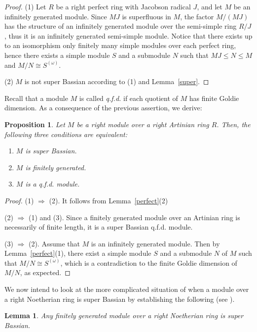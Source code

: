 \documentclass{amsart}
\newtheorem{lm}[thm]{Lemma}
\newtheorem{prop}[thm]{Proposition}
\theoremstyle{definition}
\begin{document}
\begin{proof} (1) Let $R$ be a right perfect ring with Jacobson radical $J$, and let $M$ be an infinitely generated module. Since $MJ$ is superfluous in $M$, the factor $M/(MJ)$ has the structure of an infinitely generated module over the semi-simple ring $R/J$, thus it is an infinitely generated semi-simple module. Notice that there exists up to an isomorphism only finitely many simple modules over each perfect ring, hence there exists a simple module $S$ and a submodule $N$ such that $MJ\le N\le M$ and
$M/N\cong S^{(\omega)}$.

(2) $M$ is not super Bassian according to (1) and Lemma~\ref{super}.
\end{proof}

Recall that a module $M$ is called {\it q.f.d.} if each quotient of $M$ has finite Goldie dimension.
As a consequence of the previous assertion, we derive:

\begin{prop} Let $M$ be a right module over a right Artinian ring $R$. Then, the following three conditions are equivalent:
\begin{enumerate}
\item $M$ is super Bassian.
\item $M$ is finitely generated.
\item $M$ is a q.f.d. module.
\end{enumerate}	
\end{prop}

\begin{proof} (1) $\Rightarrow$ (2). It follows from Lemma~\ref{perfect}(2)

(2) $\Rightarrow$ (1) and (3). Since a finitely generated module over an Artinian ring is necessarily of finite length, it is a super Bassian q.f.d. module.
	
(3) $\Rightarrow$ (2). Assume that $M$ is an infinitely generated module. Then by
Lemma~\ref{perfect}(1), there exist a simple module \( S \) and a submodule \( N \) of $M$ such that \(M/N \cong S^{(\omega)}\), which is a contradiction to the finite Goldie dimension of $M/N$, as expected.
\end{proof}

We now intend to look at the more complicated situation of when a module over a right Noetherian ring is super Bassian by establishing the following (see \cite[Example 2.1]{DKTZ}).

\begin{lm} Any finitely generated module over a right Noetherian ring is super Bassian.
\end{lm}
\end{document}

